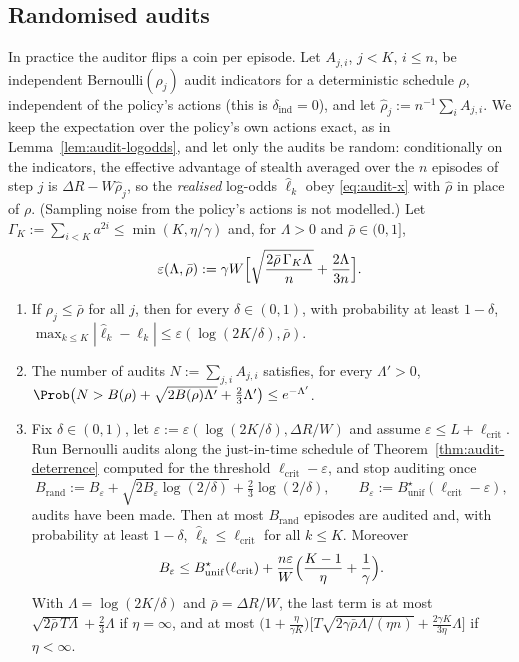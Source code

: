 \subsection{Randomised audits}

In practice the auditor flips a coin per episode. Let $A_{j,i}$,
$j<K$, $i\le n$, be independent Bernoulli$(\rho_j)$ audit indicators for a
deterministic schedule $\rho$, independent of the policy's actions (this is
$\delta_{\mathrm{ind}}=0$), and let $\hat\rho_j:=n^{-1}\sum_iA_{j,i}$. We keep
the expectation over the policy's own actions exact, as in
Lemma~\ref{lem:audit-logodds}, and let only the audits be random: conditionally
on the indicators, the effective advantage of stealth averaged over the $n$
episodes of step $j$ is $\Delta R-W\hat\rho_j$, so the \emph{realised}
log-odds $\hat\ell_k$ obey \eqref{eq:audit-x} with $\hat\rho$ in place of $\rho$.
(Sampling noise from the policy's actions is not modelled.) Let
$\Gamma_K:=\sum_{i<K}a^{2i}\le\min(K,\eta/\gamma)$ and, for $\Lambda>0$ and
$\bar\rho\in(0,1]$,
\[
  \varepsilon(\Lambda,\bar\rho):=\gamma W\Bigl[\sqrt{\frac{2\bar\rho\,\Gamma_K\Lambda}{n}}
  +\frac{2\Lambda}{3n}\Bigr].
\]

\begin{theorem}\label{thm:audit-random}
\begin{enumerate}
\item[\textup{(a)}] If $\rho_j\le\bar\rho$ for all $j$, then for every
$\delta\in(0,1)$, with probability at least $1-\delta$,
$\max_{k\le K}|\hat\ell_k-\ell_k|\le\varepsilon(\log(2K/\delta),\bar\rho)$.
\item[\textup{(b)}] The number of audits $N:=\sum_{j,i}A_{j,i}$ satisfies, for
every $\Lambda'>0$,
$\Prob\bigl(N>B(\rho)+\sqrt{2B(\rho)\Lambda'}+\tfrac23\Lambda'\bigr)\le e^{-\Lambda'}$.
\item[\textup{(c)}] Fix $\delta\in(0,1)$, let
$\varepsilon:=\varepsilon(\log(2K/\delta),\Delta R/W)$ and assume
$\varepsilon\le L+\ell_{\mathrm{crit}}$. Run Bernoulli audits along the
just-in-time schedule of Theorem~\ref{thm:audit-deterrence} computed for the
threshold $\ell_{\mathrm{crit}}-\varepsilon$, and stop auditing once
\[
  B_{\mathrm{rand}}:=B_\varepsilon+\sqrt{2B_\varepsilon\log(2/\delta)}+\tfrac23\log(2/\delta),
  \qquad B_\varepsilon:=B^\star_{\mathrm{unif}}(\ell_{\mathrm{crit}}-\varepsilon),
\]
audits have been made. Then at most $B_{\mathrm{rand}}$ episodes are audited
and, with probability at least $1-\delta$,
$\hat\ell_k\le\ell_{\mathrm{crit}}$ for all $k\le K$. Moreover
\begin{equation}\label{eq:audit-inflation}
  B_\varepsilon\le B^\star_{\mathrm{unif}}(\ell_{\mathrm{crit}})
  +\frac{n\varepsilon}{W}\Bigl(\frac{K-1}{\eta}+\frac1\gamma\Bigr).
\end{equation}
With $\Lambda=\log(2K/\delta)$ and $\bar\rho=\Delta R/W$, the last term is at
most $\sqrt{2\bar\rho\,T\Lambda}+\tfrac23\Lambda$ if $\eta=\infty$, and at most
$\bigl(1+\tfrac{\eta}{\gamma K}\bigr)\bigl[T\sqrt{2\gamma\bar\rho\Lambda/(\eta n)}
+\tfrac{2\gamma K}{3\eta}\Lambda\bigr]$ if $\eta<\infty$.
\end{enumerate}
\end{theorem}

